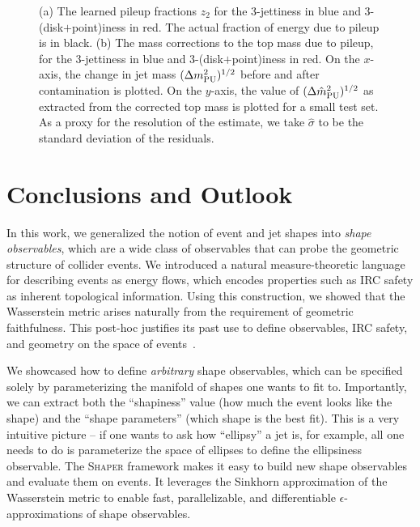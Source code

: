 \documentclass[letterpaper,11pt]{article}
\newcommand{\Shaper}{\textsc{Shaper}\xspace}
\begin{document}
\begin{figure*}[tp]
    \centering
    \caption{
        (a) The learned pileup fractions $z_2$ for the 3-jettiness in blue and 3-(disk$+$point)iness in red. The actual fraction of energy due to pileup is in black. (b) The mass corrections to the top mass due to pileup, for the 3-jettiness in blue and 3-(disk$+$point)\-iness in red. On the $x$-axis, the change in jet mass $(\Delta m^2_{\rm PU})^{1/2}$ before and after contamination is plotted. On the $y$-axis, the value of $(\Delta \hat{m}^2_{\rm PU})^{1/2}$ as extracted from the corrected top mass is plotted for a small test set. As a proxy for the resolution of the estimate, we take $\hat{\sigma}$ to be the standard deviation of the residuals.
        }
    \label{fig:pileup_corrections}
\end{figure*}


\section{Conclusions and Outlook}
\label{sec:conclusions}

In this work, we generalized the notion of event and jet shapes into \emph{shape observables}, which are a wide class of observables that can probe the geometric structure of collider events. We introduced a natural measure-theoretic language for describing events as energy flows, which encodes properties such as IRC safety as inherent topological information. Using this construction, we showed that the Wasserstein metric arises naturally from the requirement of geometric faithfulness. This post-hoc justifies its past use to define observables, IRC safety, and geometry on the space of events~\cite{Komiske_2019,2020,Cesarotti:2020hwb,Cai:2021hnn}.

We showcased how to define \emph{arbitrary} shape observables, which can be specified solely by parameterizing the manifold of shapes one wants to fit to. Importantly, we can extract both the ``shapiness'' value (how much the event looks like the shape) and the ``shape parameters'' (which shape is the best fit). This is a very intuitive picture -- if one wants to ask how ``ellipsy'' a jet is, for example, all one needs to do is parameterize the space of ellipses to define the ellipsiness observable. The \Shaper framework makes it easy to build new shape observables and evaluate them on events. It leverages the Sinkhorn approximation of the Wasserstein metric to enable fast, parallelizable, and differentiable $\epsilon$-approximations of shape observables. 
\end{document}
